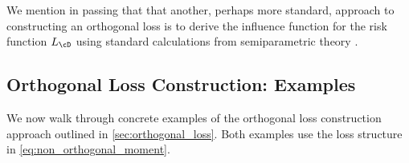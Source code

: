 \documentclass[11pt]{article} %
\newcommand{\pref}[1]{\cref{#1}}
\theoremstyle{theorem}  %
\theoremstyle{plain}
\newcommand{\poprisk}{L_{\cD}}
\begin{document}
We mention in passing that that another, perhaps more standard,
approach to constructing an orthogonal loss is to derive the influence function for
the risk function $\poprisk$ using standard calculations from
semiparametric theory \citep{van2003unifiedb,tsiatis2007semiparametric,kosorok2008introduction,kennedy2016semiparametric}. 

%

%
%
%
%
%
%
%
%
%
%
%
%
%
%
%
%
%


%
%
%
%
%
%
%
%
%
%
%
%



%





%
%
%
%
 
\subsection{Orthogonal Loss Construction: Examples}
\label{app:orthogonal_loss_examples}
%
%
We now walk through concrete examples of
the orthogonal loss construction approach outlined in
\pref{sec:orthogonal_loss}. Both examples use the loss structure in
\pref{eq:non_orthogonal_moment}.
\end{document}
